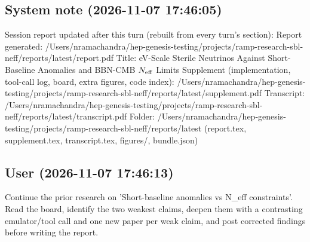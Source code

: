 \documentclass[11pt,a4paper]{article}
\begin{document}
\subsection*{System note \small(2026-11-07 17:46:05)}
Session report updated after this turn (rebuilt from every turn's section): Report generated: /Users/nramachandra/hep-genesis-testing/projects/ramp-research-sbl-neff/reports/latest/report.pdf Title: eV-Scale Sterile Neutrinos Against Short-Baseline Anomalies and BBN-CMB $N_{\rm eff}$ Limits Supplement (implementation, tool-call log, board, extra figures, code index): /Users/nramachandra/hep-genesis-testing/projects/ramp-research-sbl-neff/reports/latest/supplement.pdf Transcript: /Users/nramachandra/hep-genesis-testing/projects/ramp-research-sbl-neff/reports/latest/transcript.pdf Folder: /Users/nramachandra/hep-genesis-testing/projects/ramp-research-sbl-neff/reports/latest (report.tex, supplement.tex, transcript.tex, figures/, bundle.json)

\subsection*{User \small(2026-11-07 17:46:13)}
Continue the prior research on 'Short-baseline anomalies vs N\_eff constraints'. Read the board, identify the two weakest claims, deepen them with a contrasting emulator/tool call and one new paper per weak claim, and post corrected findings before writing the report.
\end{document}
